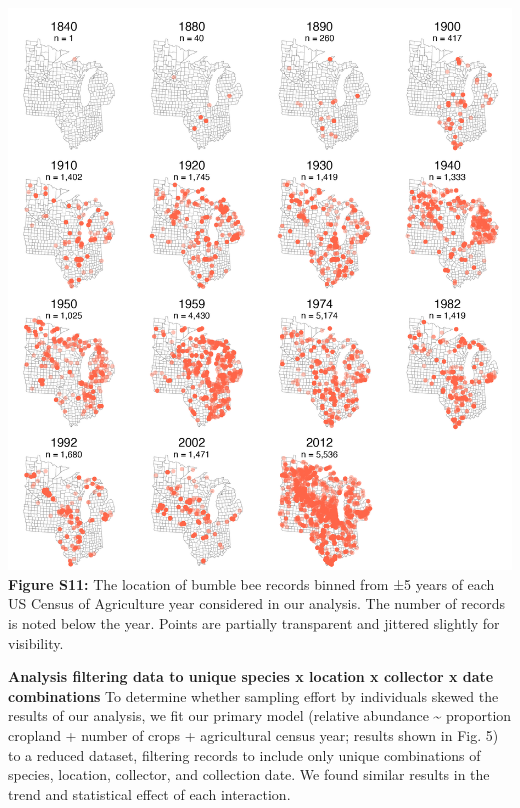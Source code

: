 \documentclass[11pt,]{article}
\begin{document}
\includegraphics[width=1\textwidth,height=\textheight]{../ms_figs/fig_s11.png}
\textbf{Figure S11:} The location of bumble bee records binned from ±5
years of each US Census of Agriculture year considered in our analysis.
The number of records is noted below the year. Points are partially
transparent and jittered slightly for visibility. \clearpage

\newpage

\textbf{Analysis filtering data to unique species x location x collector
x date combinations} To determine whether sampling effort by individuals
skewed the results of our analysis, we fit our primary model (relative
abundance \textasciitilde{} proportion cropland + number of crops +
agricultural census year; results shown in Fig. 5) to a reduced dataset,
filtering records to include only unique combinations of species,
location, collector, and collection date. We found similar results in
the trend and statistical effect of each interaction.
\end{document}
